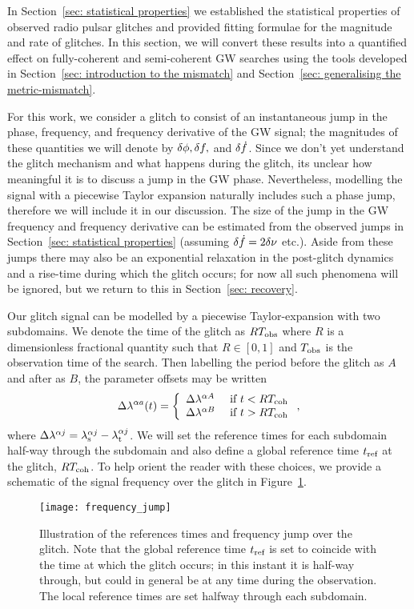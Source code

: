 \documentclass[../full_thesis/full_thesis.tex]{subfiles}
\begin{document}
In Section~\ref{sec: statistical properties} we established the statistical
properties of observed radio pulsar glitches and provided fitting formulae for the
magnitude and rate of glitches. In this section, we will convert these
results into a quantified effect on fully-coherent and semi-coherent
GW searches using the tools developed in Section~\ref{sec: introduction to the
mismatch} and Section~\ref{sec: generalising the metric-mismatch}.

For this work, we consider a glitch to consist of an instantaneous jump in the
phase, frequency, and frequency derivative of the GW signal; the magnitudes of
these quantities we will denote by $\delta\phi, \delta f,$ and
$\delta\dot{f}$.  Since we don't yet understand the glitch mechanism and what
happens during the glitch, its unclear how meaningful it is to discuss a jump
in the GW phase.  Nevertheless, modelling the signal with a piecewise Taylor
expansion naturally includes such a phase jump, therefore we will include it in
our discussion.  The size of the jump in the GW frequency and frequency
derivative can be estimated from the observed jumps in Section~\ref{sec:
statistical properties} (assuming $\delta\dot{f} = 2\delta\nu$ etc.). Aside
from these jumps there may also be an exponential relaxation in the post-glitch
dynamics and a rise-time during which the glitch occurs; for now all such
phenomena will be ignored, but we return to this in Section~\ref{sec: recovery}.

Our glitch signal can be modelled by a piecewise Taylor-expansion with two
subdomains. We denote the time of the glitch as $RT_{\mathrm{obs}}$ where $R$
is a dimensionless fractional quantity such that $R\in[0, 1]$ and $T_{\mathrm{obs}}$ is
the observation time of the search.
Then labelling the period before the glitch as $A$ and after as
$B$, the parameter offsets may be written
\begin{align}
\Delta\lambda^{\alpha a}(t) = \left\{
\begin{array}{lc}
\Delta\lambda^{\alpha A} & \textrm{ if } t < RT_{\mathrm{coh}}\\
\Delta\lambda^{\alpha B} & \textrm{ if } t > RT_{\mathrm{coh}}
\end{array}
\right.,
\label{eqn: delta lambda alpha glitch}
\end{align}
where $\Delta\lambda^{\alpha j} = {\lambda}_\textrm{s}^{\alpha j} - {\lambda}_\textrm{t}^{\alpha j}$. We will set the
reference times for each subdomain half-way through the subdomain and also define a global
reference time $t_{\textrm{ref}}$ at the glitch, $RT_{\mathrm{coh}}$. To help orient the reader with
these choices, we provide a schematic of the signal frequency over the glitch
in Figure~\ref{fig: frequency jump}.
\begin{figure}[htb]
\centering
\texttt{[image: frequency\_jump]}
\caption{Illustration of the references times and frequency jump over the glitch.
Note that the global reference time $t_{\textrm{ref}}$ is set to coincide with the time
at which the glitch occurs; in this instant it is half-way through, but could
in general be at any time during the observation. The local reference times are
set halfway through each subdomain.}
\label{fig: frequency jump}
\end{figure}
\end{document}
